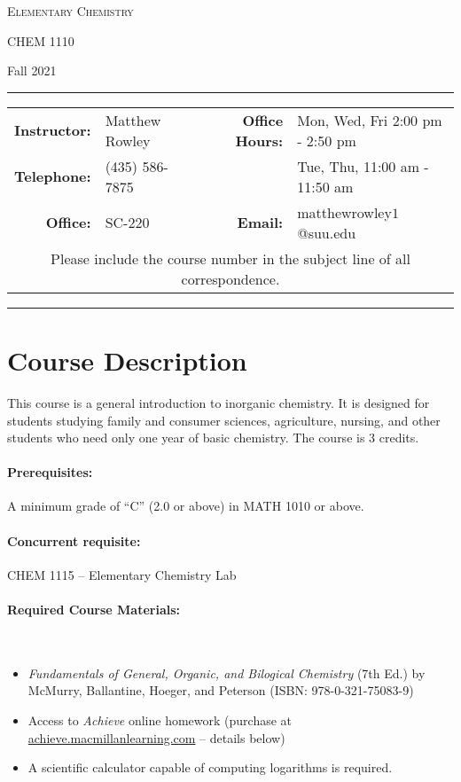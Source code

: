 \documentclass[12pt, letterpaper]{article}
\begin{document}
\begin{center}
{\Large \textsc{Elementary Chemistry}}

CHEM 1110
\end{center}
\begin{center}
	{\large Fall 2021}
\end{center}
\begin{center}
	\rule{\textwidth}{0.4pt}
	\begin{tabular}{rlcrl}
		\textbf{Instructor:} & Matthew Rowley & & \textbf{Office Hours:} & Mon, Wed, Fri 2:00 pm - 2:50 pm \\
		\textbf{Telephone:} & (435) 586-7875 & & & Tue, Thu, 11:00 am - 11:50 am\\
		\textbf{Office:} & SC-220 & & \textbf{Email:} & matthewrowley$1$@suu.edu\\
		\multicolumn{5}{c}{Please include the course number in the subject line of all correspondence.} 
	\end{tabular}
	\rule{\textwidth}{0.4pt}
\end{center}

\section*{Course Description} 
This course is a general introduction to inorganic chemistry. It is designed for students studying family and consumer sciences, agriculture, nursing, and other students who need only one year of basic chemistry. The course is 3 credits.

\paragraph{Prerequisites:}
A minimum grade of ``C'' (2.0 or above) in MATH 1010 or above.

\paragraph{Concurrent requisite:}
CHEM 1115 -- Elementary Chemistry Lab

\paragraph{Required Course Materials:} ~

\begin{itemize}
\item \emph{Fundamentals of General, Organic, and Bilogical Chemistry} (7th Ed.) by McMurry, Ballantine, Hoeger, and Peterson (ISBN: 978-0-321-75083-9)
\item Access to \emph{Achieve} online homework (purchase at \href{https://achieve.macmillanlearning.com/}{achieve.macmillanlearning.com} -- details below) 
\item A scientific calculator capable of computing logarithms is required.
\end{itemize}
\end{document}
